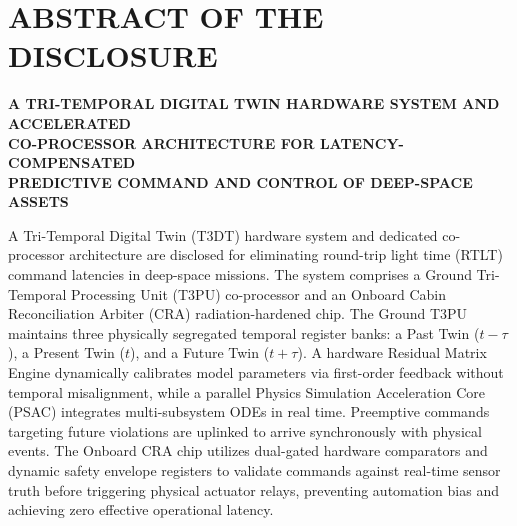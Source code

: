 \documentclass[12pt,a4paper]{article}
\begin{document}
\newpage

\section*{ABSTRACT OF THE DISCLOSURE}
\noindent \textbf{A TRI-TEMPORAL DIGITAL TWIN HARDWARE SYSTEM AND ACCELERATED \\ CO-PROCESSOR ARCHITECTURE FOR LATENCY-COMPENSATED \\ PREDICTIVE COMMAND AND CONTROL OF DEEP-SPACE ASSETS} \\
\vspace{0.5cm}

A Tri-Temporal Digital Twin (T3DT) hardware system and dedicated co-processor architecture are disclosed for eliminating round-trip light time (RTLT) command latencies in deep-space missions. The system comprises a Ground Tri-Temporal Processing Unit (T3PU) co-processor and an Onboard Cabin Reconciliation Arbiter (CRA) radiation-hardened chip. The Ground T3PU maintains three physically segregated temporal register banks: a Past Twin ($t-\tau$), a Present Twin ($t$), and a Future Twin ($t+\tau$). A hardware Residual Matrix Engine dynamically calibrates model parameters via first-order feedback without temporal misalignment, while a parallel Physics Simulation Acceleration Core (PSAC) integrates multi-subsystem ODEs in real time. Preemptive commands targeting future violations are uplinked to arrive synchronously with physical events. The Onboard CRA chip utilizes dual-gated hardware comparators and dynamic safety envelope registers to validate commands against real-time sensor truth before triggering physical actuator relays, preventing automation bias and achieving zero effective operational latency.
\end{document}
